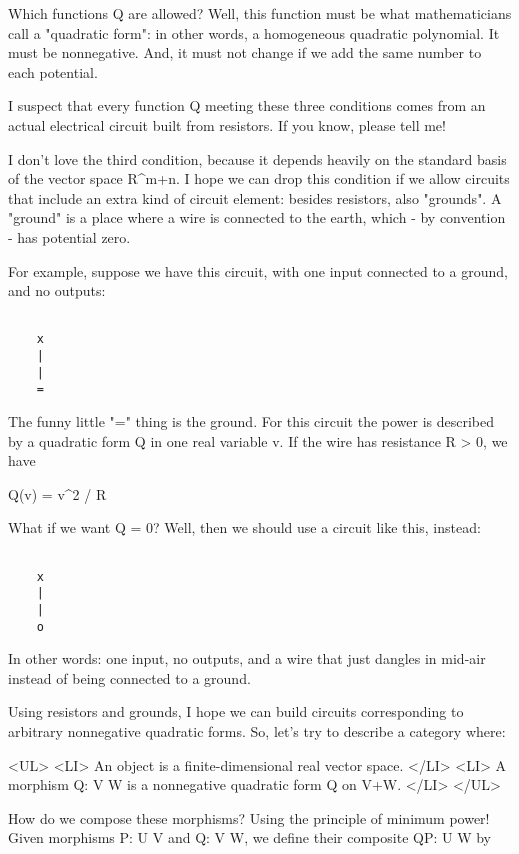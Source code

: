 Which functions Q are allowed?  Well, this function must be what
mathematicians call a "quadratic form": in other words, a
homogeneous quadratic polynomial.  It must be nonnegative.  And, it
must not change if we add the same number to each potential.

I suspect that every function Q meeting these three conditions comes
from an actual electrical circuit built from resistors.  If you know,
please tell me!  

I don't love the third condition, because it depends heavily on the
standard basis of the vector space R^{m+n}.  I hope we can
drop this condition if we allow circuits that include an extra kind of
circuit element: besides resistors, also "grounds".  A
"ground" is a place where a wire is connected to the earth,
which - by convention - has potential zero.

For example, suppose we have this circuit, with one input connected 
to a ground, and no outputs:


\begin{verbatim}

    x
    |
    |
    =
\end{verbatim}
    

The funny little "=" thing is the ground.  For this circuit the power
is described by a quadratic form Q in one real variable v.  If the
wire has resistance R > 0, we have

Q(v) = v^{2} / R

What if we want Q = 0?  Well, then we should use a circuit like this,
instead:


\begin{verbatim}

    x
    |
    |
    o
\end{verbatim}
    
In other words: one input, no outputs, and a wire that just dangles in
mid-air instead of being connected to a ground.

Using resistors and grounds, I hope we can build circuits corresponding 
to arbitrary nonnegative quadratic forms.  So, let's try to describe a
category where:

<UL>
<LI>
  An object is a finite-dimensional real vector space.  
</LI>
<LI>
  A morphism Q: V \to  W is a nonnegative quadratic form Q on V+W.
</LI>
</UL>

How do we compose these morphisms?  Using the principle of minimum
power!  Given morphisms P: U \to  V and Q: V \to  W, we define their
composite QP: U \to  W by


